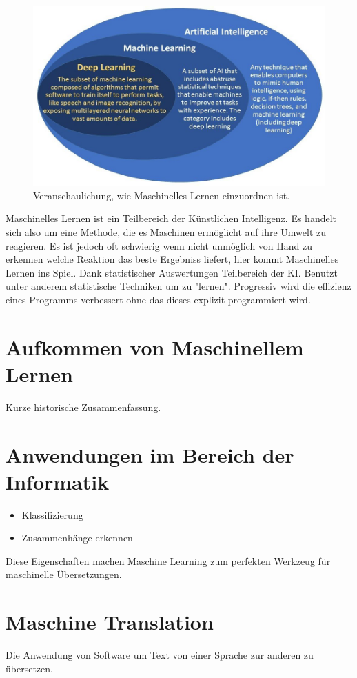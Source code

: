 \documentclass{thesisclass}
\begin{document}
\begin{figure}[h]
  \center
  \includegraphics[width=\textwidth]{images/machineLearningInAI.jpg}
  \caption{Veranschaulichung, wie Maschinelles Lernen einzuordnen ist. \cite{machineLearning1}}
  \label{fig:Veranschaulichung, wie Maschinelles Lernen einzuordnen ist.}
\end{figure}

Maschinelles Lernen ist ein Teilbereich der Künstlichen Intelligenz. Es handelt sich also um eine Methode, die es Maschinen ermöglicht auf ihre Umwelt zu reagieren. Es ist jedoch oft schwierig wenn nicht unmöglich von Hand zu erkennen welche Reaktion das beste Ergebniss liefert, hier kommt Maschinelles Lernen ins Spiel. Dank statistischer Auswertungen 
Teilbereich der KI. Benutzt unter anderem statistische Techniken um zu "lernen". Progressiv wird die effizienz eines Programms verbessert ohne das dieses explizit programmiert wird.
\section{Aufkommen von Maschinellem Lernen}
Kurze historische Zusammenfassung.
\section{Anwendungen im Bereich der Informatik	}
\begin{itemize}
	\item Klassifizierung
	\item Zusammenhänge erkennen
\end{itemize}
Diese Eigenschaften machen Maschine Learning zum perfekten Werkzeug für maschinelle Übersetzungen.
\section{Maschine Translation}
Die Anwendung von Software um Text von einer Sprache zur anderen zu übersetzen.
\end{document}
